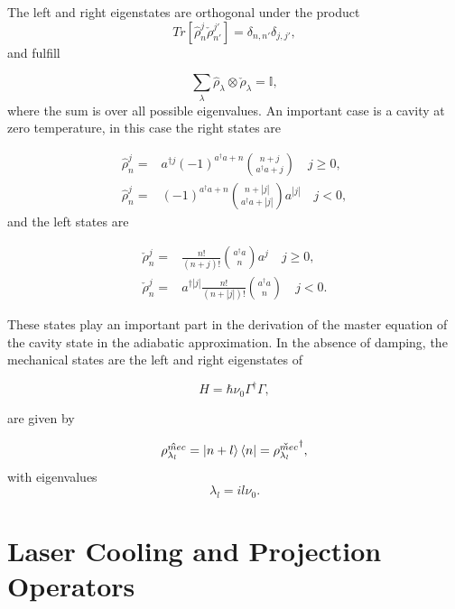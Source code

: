 \documentclass[reprint, amsmath,amssymb, aps,pra]{revtex4-1}
\begin{document}
The left and right eigenstates are orthogonal under the product
\begin{equation}
Tr[\hat{\rho}_n^j\check{\rho}_{n'}^{j'}] = \delta_{n,n'}\delta_{j,j'},
\end{equation} and fulfill

\begin{equation}\label{DampingBasisCompleteness}
\sum_{\lambda} \hat{\rho}_\lambda \otimes \check{\rho}_\lambda = \mathbb{I},
\end{equation} where the sum is over all possible eigenvalues. An important case is a cavity at zero temperature, in this case the right states are \cite{EnglertDB}

\begin{align}\label{DefDBZero}
\hat{\rho}_n^j=&a^{\dagger j}(-1)^{a^\dagger a + n}\binom{n+j}{a^\dagger a+j} \quad j \geq 0, \\
\hat{\rho}_n^j=&(-1)^{a^\dagger a + n}\binom{n+|j|}{a^\dagger a+|j|}a^{|j|} \quad j < 0,
\end{align} and the left states are

\begin{align}\label{DefDBDualZero}
\check{\rho}_n^j=&\frac{n!}{(n+j)!}\binom{a^\dagger a}{n}a^j \quad j \geq 0, \\
\check{\rho}_n^j=&a^{\dagger|j|}\frac{n!}{(n+|j|)!}\binom{a^\dagger a}{n} \quad j < 0.
\end{align}

These states play an important part in the derivation of the master
equation of the cavity state in the adiabatic approximation. In the absence of damping, the mechanical states are the left and right
eigenstates of 

\begin{equation}
H=\hbar\nu_0\Gamma^\dagger\Gamma,
\end{equation}

are given by

\begin{equation}
\hat{\rho_{\lambda_l}^{mec}}=\Ket{n+l}\Bra{n}=\check{\rho_{\lambda_l}^{mec}}^\dagger,
\end{equation} 
with eigenvalues
\begin{equation}
\lambda_l = i l \nu_0.
\end{equation}

\section{Laser Cooling and Projection Operators}\label{CoolingAppendix}
\end{document}
